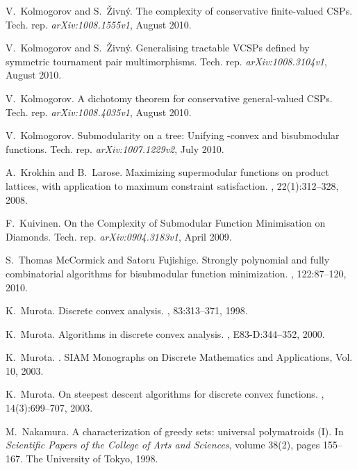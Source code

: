 \documentclass[11pt,onecolumn]{article}
\begin{document}
\begin{thebibliography}{10}
V.~Kolmogorov and S.~\v{Z}ivn\'y.
\newblock The complexity of conservative finite-valued {C}{S}{P}s.
\newblock Tech. rep. {\em arXiv:1008.1555v1}, August 2010.

V.~Kolmogorov and S.~\v{Z}ivn\'y.
\newblock Generalising tractable {V}{C}{S}{P}s defined by symmetric tournament pair multimorphisms.
\newblock Tech. rep. {\em arXiv:1008.3104v1}, August 2010.

V.~Kolmogorov.
\newblock A dichotomy theorem for conservative general-valued {C}{S}{P}s.
\newblock Tech. rep. {\em arXiv:1008.4035v1}, August 2010.

V.~Kolmogorov.
\newblock Submodularity on a tree: Unifying -convex and bisubmodular functions.
\newblock Tech. rep. {\em arXiv:1007.1229v2}, July 2010.

A.~Krokhin and B.~Larose.
\newblock Maximizing supermodular functions on product lattices, with application to maximum constraint satisfaction.
, 22(1):312--328, 2008.

F.~Kuivinen.
\newblock On the Complexity of Submodular Function Minimisation on Diamonds.
\newblock Tech. rep. {\em arXiv:0904.3183v1}, April 2009.

S.~Thomas McCormick and Satoru Fujishige.
\newblock Strongly polynomial and fully combinatorial algorithms for
  bisubmodular function minimization.
, 122:87--120, 2010.

K.~Murota.
\newblock Discrete convex analysis.
, 83:313--371, 1998.

K.~Murota.
\newblock Algorithms in discrete convex analysis.
, E83-D:344--352,
  2000.

K.~Murota.
.
\newblock SIAM Monographs on Discrete Mathematics and Applications, Vol. 10,
  2003.

K.~Murota.
\newblock On steepest descent algorithms for discrete convex functions.
, 14(3):699--707, 2003.

M.~Nakamura.
\newblock A characterization of greedy sets: universal polymatroids ({I}).
\newblock In {\em Scientific Papers of the College of Arts and Sciences},
  volume 38(2), pages 155--167. The University of Tokyo, 1998.


\end{thebibliography}
\end{document}
